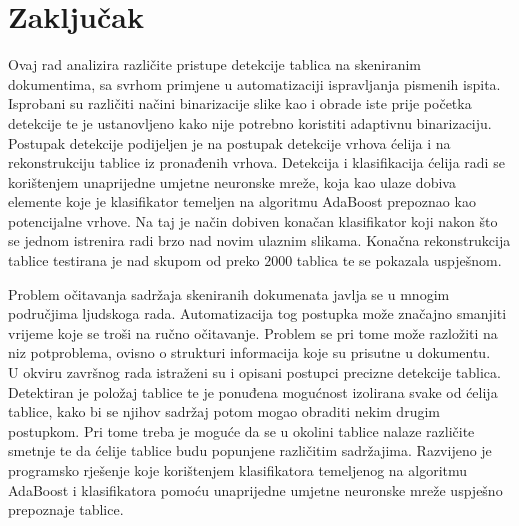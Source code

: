 \documentclass[times, utf8, zavrsni, numeric]{fer}
\begin{document}
\chapter{Zaključak}
\label{ch:conclusion}
Ovaj rad analizira različite pristupe detekcije tablica na skeniranim dokumentima, sa svrhom primjene u automatizaciji ispravljanja pismenih ispita.
Isprobani su različiti načini binarizacije slike kao i obrade iste prije početka detekcije te je ustanovljeno kako nije potrebno koristiti adaptivnu binarizaciju.
Postupak detekcije podijeljen je na postupak detekcije vrhova ćelija i na rekonstrukciju tablice iz pronađenih vrhova.
Detekcija i klasifikacija ćelija radi se korištenjem unaprijedne umjetne neuronske mreže, koja kao ulaze dobiva elemente koje je klasifikator temeljen na algoritmu AdaBoost prepoznao kao potencijalne vrhove.
Na taj je način dobiven konačan klasifikator koji nakon što se jednom istrenira radi brzo nad novim ulaznim slikama.
Konačna rekonstrukcija tablice testirana je nad skupom od preko $2000$ tablica te se pokazala uspješnom.






\begin{sazetak}
Problem očitavanja sadržaja skeniranih dokumenata javlja se u mnogim područjima ljudskoga rada.
Automatizacija tog postupka može značajno smanjiti vrijeme koje se troši na ručno očitavanje. 
Problem se pri tome može razložiti na niz potproblema, ovisno o strukturi informacija koje su prisutne u dokumentu.\\

U okviru završnog rada istraženi su i opisani postupci precizne detekcije tablica. 
Detektiran je položaj tablice te je ponuđena mogućnost izolirana svake od ćelija tablice, kako bi se njihov sadržaj potom mogao obraditi nekim drugim postupkom.
Pri tome treba je moguće da se u okolini tablice nalaze različite smetnje te da ćelije tablice budu popunjene različitim sadržajima. 
Razvijeno je programsko rješenje koje korištenjem klasifikatora temeljenog na algoritmu AdaBoost i klasifikatora pomoću unaprijedne umjetne neuronske mreže uspješno prepoznaje tablice.


\end{sazetak}
\end{document}
